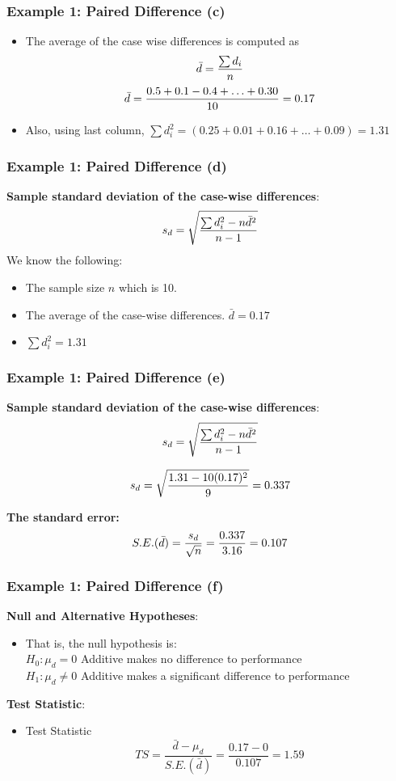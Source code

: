 \documentclass[a4]{beamer}
\begin{document}
\begin{frame}
\frametitle{Example 1: Paired Difference (c)}
\begin{itemize}
\item The average of the case wise differences is computed as \[\bar{d} = {\sum d_i \over n}\]
\[ \bar{d} = { 0.5 + 0.1  - 0.4 + \ldots + 0.30 \over 10 }= 0.17 \]
\item Also, using last column, $\sum d^2_i = (0.25 + 0.01 + 0.16 + \ldots + 0.09) = 1.31$
\end{itemize}

\end{frame}


\begin{frame}
\frametitle{Example 1: Paired Difference (d)}
\textbf{Sample standard deviation of the case-wise differences}:
\large
\[s_d = \sqrt{ {\sum d_i^2 - n\bar{d}^2 \over n-1}}\]
\vspace{0.2cm}
We know the following:
\begin{itemize}
\item The sample size $n$ which is 10.
\item The average of the case-wise differences. $\bar{d} = 0.17$
\item  $\sum d^2_i = 1.31$
\end{itemize}
\end{frame}



\begin{frame}
\frametitle{Example 1: Paired Difference (e)}
\textbf{Sample standard deviation  of the case-wise differences}:
\[s_d = \sqrt{ {\sum d_i^2 - n\bar{d}^2 \over n-1}}\]

\[s_d = \sqrt{ { 1.31 - 10(0.17)^2 \over 9}} = 0.337\]

\textbf{The standard error:} \[ S.E.(\bar{d}) = \frac{s_d }{\sqrt{n}} = {0.337 \over 3.16} = 0.107\]
\end{frame}

\begin{frame}
\frametitle{Example 1: Paired Difference (f)}
\textbf{Null and Alternative Hypotheses}:
\begin{itemize}
\item That is, the null hypothesis is:\\
$H_0: \mu_d = 0$ Additive makes no difference to performance\\
$H_1: \mu_d \neq 0$ Additive makes a significant difference to performance \\
\end{itemize}
\vspace{0.5cm}
\textbf{Test Statistic}:
\begin{itemize}
\item Test Statistic
\[TS =\frac{\bar{d} - \mu_d}{S.E.(\bar{d})} =  \frac{0.17 - 0}{0.107} = 1.59\]
\end{itemize}
\end{frame}
\end{document}
